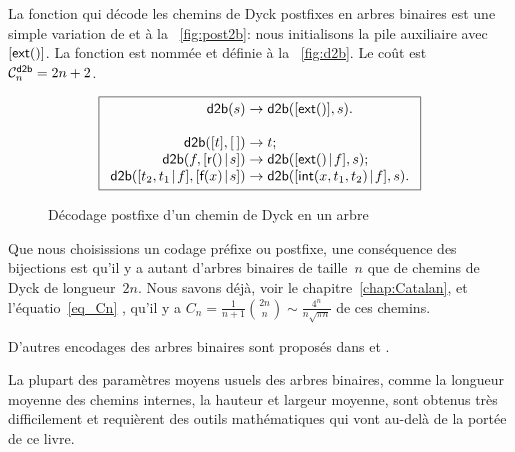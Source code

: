 La fonction qui décode les chemins de Dyck
postfixes en arbres binaires est une simple variation de
 et
 à la
\fig~\vref{fig:post2b}: nous initialisons la pile auxiliaire avec
\([\fun{ext}()]\). La fonction est nommée
 et définie à la
\fig~\vref{fig:d2b}. Le coût est \(\C{\fun{d2b}}{n} = 2n +
2\).

\bigskip

\begin{figure}[h]
\begin{equation*}
\boxed{
\begin{array}{r@{\;}c@{\;}l}
\fun{d2b}(s) & \rightarrow & \fun{d2b}([\fun{ext}()],s).\\
\\
\fun{d2b}([t],\el) & \rightarrow & t;\\
\fun{d2b}(f,\cons{\fun{r}()}{s}) & \rightarrow & \fun{d2b}(\cons{\fun{ext}()}{f},s);\\
\fun{d2b}(\cons{t_2,t_1}{f},\cons{\fun{f}(x)}{s}) & \rightarrow & \fun{d2b}(\cons{\fun{int}(x,t_1,t_2)}{f},s).
\end{array}}
\end{equation*}
\caption{Décodage postfixe d'un chemin de Dyck en un arbre\label{fig:d2b}}
\end{figure}

\bigskip

Que nous choisissions un codage préfixe ou postfixe, une conséquence
des bijections est qu'il y a autant d'arbres binaires de taille~\(n\)
que de chemins de Dyck de longueur~\(2n\). Nous savons déjà, voir le chapitre~\ref{chap:Catalan}, et l'équatio~\eqref{eq_Cn}
, qu'il y a \(C_n = \frac{1}{n+1}\binom{2n}{n}
\sim \frac{4^n}{n\sqrt{\pi n}}\) de ces chemins.

D'autres encodages des arbres binaires sont proposés dans
\cite[2.3.3]{Knuth_1997} et \cite[5.11]{SedgewickFlajolet_1996}.



La plupart des paramètres moyens usuels des arbres binaires, comme la
longueur moyenne des chemins internes, la hauteur et largeur moyenne,
sont obtenus très difficilement et requièrent des outils mathématiques
qui vont au-delà de la portée de ce livre.

